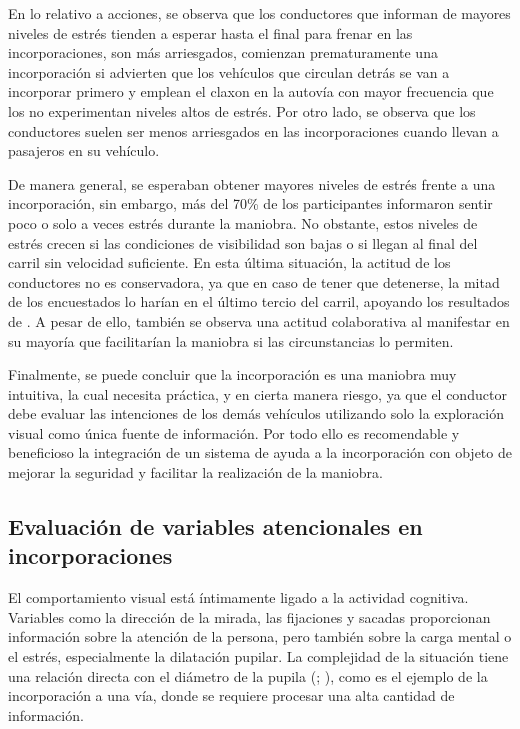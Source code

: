 En lo relativo a acciones, se observa que los conductores que informan de mayores niveles de estrés tienden a esperar hasta el final para frenar en las incorporaciones, son más arriesgados, comienzan prematuramente una incorporación si advierten que los vehículos que circulan detrás se van a incorporar primero y emplean el claxon en la autovía con mayor frecuencia que los no experimentan niveles altos de estrés. Por otro lado, se observa que los conductores suelen ser menos arriesgados en las incorporaciones cuando llevan a pasajeros en su vehículo. 

De manera general, se esperaban obtener mayores niveles de estrés frente a una incorporación, sin embargo, más del 70\% de los participantes informaron sentir poco o solo a veces estrés durante la maniobra. No obstante, estos niveles de estrés crecen si las condiciones de visibilidad son bajas o si llegan al final del carril sin velocidad suficiente. En esta última situación, la actitud de los conductores no es conservadora, ya que en caso de tener que detenerse, la mitad de los encuestados lo harían en el último tercio del carril, apoyando los resultados de \textcite{marczak}. A pesar de ello, también se observa una actitud colaborativa al manifestar en su mayoría que facilitarían la maniobra si las circunstancias lo permiten. 

Finalmente, se puede concluir que la incorporación es una maniobra muy intuitiva, la cual necesita práctica, y en cierta manera riesgo, ya que el conductor debe evaluar las intenciones de los demás vehículos utilizando solo la exploración visual como única fuente de información. Por todo ello es recomendable y beneficioso la integración de un sistema de ayuda a la incorporación con objeto de mejorar la seguridad y facilitar la realización de la maniobra.  

\subsection{Evaluación de variables atencionales en incorporaciones} \label{312}

El comportamiento visual está íntimamente ligado a la actividad cognitiva. Variables como la dirección de la mirada, las fijaciones y sacadas proporcionan información sobre la atención de la persona, pero también sobre la carga mental o el estrés, especialmente la dilatación pupilar. La complejidad de la situación tiene una relación directa con el diámetro de la pupila (\cite{wickens}; \cite{poock}), como es el ejemplo de la incorporación a una vía, donde se requiere procesar una alta cantidad de información. 

